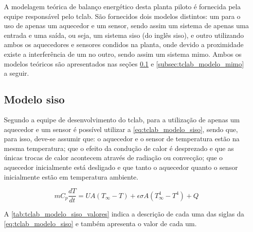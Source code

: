 A modelagem teórica de balanço energético desta planta piloto é fornecida pela equipe responsável
pelo \acrshort{tclab}. São fornecidos dois modelos distintos: um para o uso de apenas um aquecedor e
um sensor, sendo assim um sistema de apenas uma entrada e uma saída, ou seja, um sistema \acrshort{siso}
(do inglês \acrlong{siso}), e outro utilizando ambos os aquecedores e sensores condidos na planta,
onde devido a proximidade existe a interferência de um no outro, sendo assim um sistema \acrshort{mimo}.
Ambos os modelos teóricos são apresentados nas seções \ref{subsec:tclab_modelo_siso} e
\ref{subsec:tclab_modelo_mimo} a seguir.

\subsection{Modelo \acrshort{siso}}
\label{subsec:tclab_modelo_siso}

Segundo a equipe de desenvolvimento do \acrshort{tclab}, para a utilização de apenas um aquecedor e
um sensor é possível utilizar a \cref{eq:tclab_modelo_siso}, sendo que, para isso, deve-se assumir
que: o aquecedor e o sensor de temperatura estão na mesma temperatura; que o efeito da condução de calor
é desprezado e que as únicas trocas de calor acontecem através de radiação ou convecção; que o
aquecedor inicialmente está desligado e que tanto o aquecedor quanto o sensor inicialmente estão
em temperatura ambiente.

\begin{equation}
	\label{eq:tclab_modelo_siso}
	mC_p \dfrac{dT}{dt} = UA (T_{\infty} - T) + \epsilon \sigma A (T_{\infty}^{4} - T^{4}) + Q
\end{equation}

A \cref{tab:tclab_modelo_siso_valores} indica a descrição de cada uma das siglas da
\cref{eq:tclab_modelo_siso} e também apresenta o valor de cada um.

